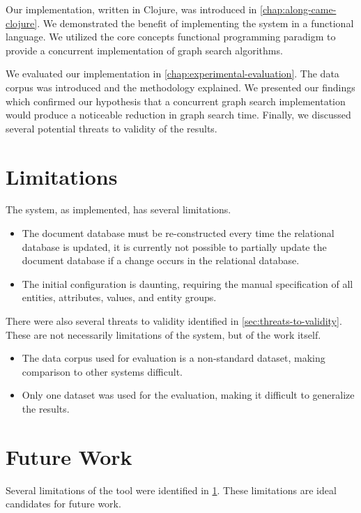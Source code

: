 		Our implementation, written in Clojure, was introduced in \cref{chap:along-came-clojure}.  We demonstrated the benefit of implementing the system in a functional language.  We utilized the core concepts functional programming paradigm to provide a concurrent implementation of graph search algorithms.
		
		We evaluated our implementation in \cref{chap:experimental-evaluation}.  The data corpus was introduced and the methodology explained.  We presented our findings which confirmed our hypothesis that a concurrent graph search implementation would produce a noticeable reduction in graph search time.  Finally, we discussed several potential threats to validity of the results.
	
	\section{Limitations}
	\label{sec:limitations}
		The system, as implemented, has several limitations.
		
		\begin{itemize}
			\item The document database must be re-constructed every time the relational database is updated, it is currently not possible to partially update the document database if a change occurs in the relational database.
			\item The initial configuration is daunting, requiring the manual specification of all entities, attributes, values, and entity groups.
		\end{itemize}
		
		There were also several threats to validity identified in \cref{sec:threats-to-validity}.  These are not necessarily limitations of the system, but of the work itself.
		
		\begin{itemize}
			\item The data corpus used for evaluation is a non-standard dataset, making comparison to other systems difficult.
			\item Only one dataset was used for the evaluation, making it difficult to generalize the results.
		\end{itemize}
	
	\section{Future Work}
		Several limitations of the tool were identified in \cref{sec:limitations}.  These limitations are ideal candidates for future work.
		
